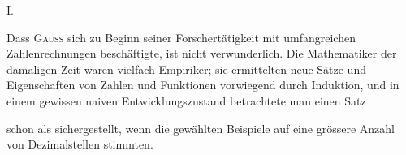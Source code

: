 \clearpage\begingroup
{}
\renewcommand{\thefootnote}{\arabic{footnote})}\setcounter{footnote}{0}
\begin{center}I.\\[3pt]{\large{}}\end{center}
\noindent\hspace*{\parindent}Dass \textsc{Gauss} sich zu Beginn seiner Forschertätigkeit mit umfangreichen
Zahlenrechnungen beschäftigte, ist nicht verwunderlich. Die Mathematiker
der damaligen Zeit waren vielfach Empiriker; sie ermittelten neue Sätze und
Eigenschaften von Zahlen und Funktionen vorwiegend durch Induktion, und
in einem gewissen naiven Entwicklungszustand betrachtete man einen Satz
\par\clearpage{}
\noindent schon als sichergestellt, wenn die gewählten Beispiele auf eine grössere Anzahl von Dezimalstellen stimmten.

